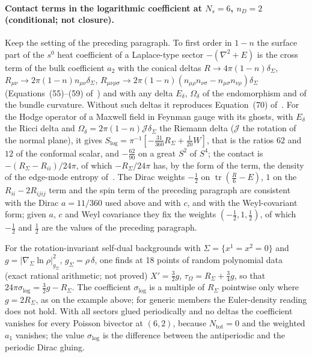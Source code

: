 \paragraph{Contact terms in the logarithmic coefficient at \(N_s=6\), \(n_D=2\) (conditional; not closure).}
Keep the setting of the preceding paragraph. To first order in \(1-n\) the surface part of the \(s^0\) heat coefficient of a Laplace-type sector \(-(\nabla^2+E)\) is the cross term of the bulk coefficient \(a_2\) with the conical deltas \(R\to4\pi(1-n)\delta_\Sigma\), \(R_{\mu\nu}\to2\pi(1-n)n_{\mu\nu}\delta_\Sigma\), \(R_{\mu\nu\rho\sigma}\to2\pi(1-n)(n_{\mu\rho}n_{\nu\sigma}-n_{\mu\sigma}n_{\nu\rho})\delta_\Sigma\) (Equations~(55)--(59) of~\cite{Solodukhin2011}) and with any delta \(E_\delta\), \(\Omega_\delta\) of the endomorphism and of the bundle curvature. Without such deltas it reproduces Equation~(70) of~\cite{Solodukhin2011}. For the Hodge operator of a Maxwell field in Feynman gauge with its ghosts, with \(E_\delta\) the Ricci delta and \(\Omega_\delta=2\pi(1-n)\mathcal J\delta_\Sigma\) the Riemann delta (\(\mathcal J\) the rotation of the normal plane), it gives \(S_{\log}=\pi^{-1}[-\tfrac{31}{360}R_\Sigma+\tfrac1{20}W]\), that is the ratios \(62\) and \(12\) of the conformal scalar, and \(-\tfrac{62}{90}\) on a great \(S^2\) of \(S^4\); the contact is \(-(R_\Sigma-R_{ii})/24\pi\), of which \(-R_\Sigma/24\pi\) has, by the form of the term, the density of the edge-mode entropy of~\cite{DonnellyWall2016}. The Dirac weights \(-\tfrac12\) on \(\operatorname{tr}(\tfrac R6-E)\), \(1\) on the \(R_{ii}-2R_{ijij}\) term and the spin term of the preceding paragraph are consistent with the Dirac \(a=11/360\) used above and with \(c\), and with the Weyl-covariant form; given \(a\), \(c\) and Weyl covariance they fix the weights \((-\tfrac12,1,\tfrac12)\), of which \(-\tfrac12\) and \(\tfrac12\) are the values of the preceding paragraph.

For the rotation-invariant self-dual backgrounds with \(\Sigma=\{x^1=x^2=0\}\) and \(g=|\nabla_\Sigma\ln\rho|^2_{g_\Sigma}\), \(g_\Sigma=\rho\,\delta\), one finds at 18 points of random polynomial data (exact rational arithmetic; not proved) \(X'=\tfrac32g\), \(\tau_\Omega=R_\Sigma+\tfrac34g\), so that \(24\pi\sigma_{\log}=\tfrac32g-R_\Sigma\). The coefficient \(\sigma_{\log}\) is a multiple of \(R_\Sigma\) pointwise only where \(g=2R_\Sigma\), as on the example above; for generic members the Euler-density reading does not hold. With all sectors glued periodically and no deltas the coefficient vanishes for every Poisson bivector at \((6,2)\), because \(N_{\mathrm{tot}}=0\) and the weighted \(a_1\) vanishes; the value \(\sigma_{\log}\) is the difference between the antiperiodic and the periodic Dirac gluing.

